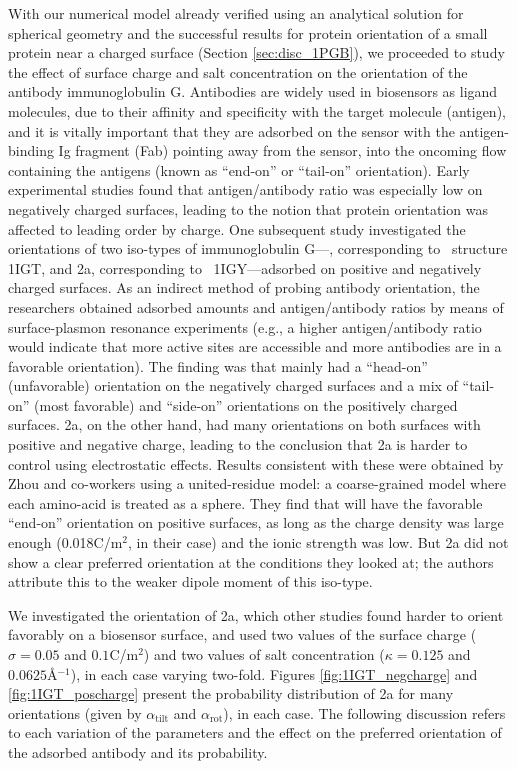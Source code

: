 With our numerical model already verified using an analytical solution for spherical geometry\cite{CooperBarba2015a} and the successful results for protein orientation of a small protein near a charged surface (Section \ref{sec:disc_1PGB}), we proceeded to study the effect of surface charge and salt concentration on the orientation of the antibody immunoglobulin G. Antibodies are widely used in biosensors as ligand molecules, due to their affinity and specificity with the target molecule (antigen), and it is vitally important that they are adsorbed on the sensor with the antigen-binding Ig fragment (Fab) pointing away from the sensor, into the oncoming flow containing the antigens (known as ``end-on'' or ``tail-on'' orientation).
Early experimental studies found that antigen/antibody ratio was especially low on negatively charged surfaces,\cite{BuijsETal1997} leading to the notion that protein orientation was affected to leading order by charge. 
One subsequent study\cite{ChenLiuZhouJiang2003} investigated the orientations of two iso-types of immunoglobulin G---, corresponding to \pdb\ structure {\small 1IGT}, and \ig 2a, corresponding to \pdb\ {\small 1IGY}---adsorbed on positive and negatively charged surfaces. 
As an indirect method of probing antibody orientation, the researchers obtained adsorbed amounts and antigen/antibody ratios by means of surface-plasmon resonance experiments (e.g., a higher antigen/antibody ratio would indicate that more active sites are accessible and more antibodies are in a favorable orientation). 
The finding was that  mainly had a ``head-on'' (unfavorable) orientation on the negatively charged surfaces and a mix of ``tail-on'' (most favorable) and ``side-on'' orientations on the positively charged surfaces. 
\ig 2a, on the other hand, had many orientations on both surfaces with positive and negative charge, leading to the conclusion that \ig 2a is harder to control using electrostatic effects.
Results consistent with these were obtained by Zhou and co-workers\cite{ZhouChenJiang2003} using a united-residue model: a coarse-grained model where each amino-acid is treated as a sphere. They find that  will have the favorable ``end-on'' orientation on positive surfaces, as long as the charge density was large enough (0.018C/m$^{2}$, in their case) and the ionic strength was low. But \ig 2a  did not show a clear preferred orientation at the conditions they looked at; the authors attribute this to the weaker dipole moment of this iso-type.
 
We investigated the orientation of \ig 2a, which other studies found harder to orient favorably on a biosensor surface, and used two values of the surface charge ($\sigma=0.05$ and $0.1$C/m$^{2}$) and two values of salt concentration ($\kappa=0.125$ and $0.0625$\AA$^{-1}$), in each case varying two-fold.
 Figures \ref{fig:1IGT_negcharge} and \ref{fig:1IGT_poscharge} present the probability distribution of \ig 2a for many orientations (given by $\alpha_\text{tilt}$ and $\alpha_\text{rot}$), in each case.
 The following discussion refers to each variation of the parameters and the effect on the preferred orientation of the adsorbed antibody and its probability.

